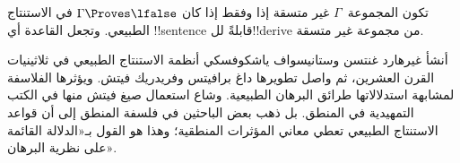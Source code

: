 \documentclass[../../../include/open-logic-section]{subfiles}
\begin{document}
تكون المجموعة~$\Gamma$ غير متسقة إذا وفقط إذا كان
$\Gamma \Proves \lfalse$ في الاستنتاج الطبيعي. وتجعل القاعدة
\FalseInt{} أي !!{sentence} قابلةً لل!!{derive} من مجموعة غير
متسقة.

أنشأ غيرهارد غنتسن وستانيسواف ياشكوفسكي أنظمة الاستنتاج الطبيعي في ثلاثينيات القرن العشرين، ثم واصل تطويرها داغ برافيتس وفريدريك فيتش.
ويؤثرها الفلاسفة لمشابهة استدلالاتها طرائق البرهان الطبيعية. وشاع استعمال صيغ فيتش منها في الكتب التمهيدية في المنطق.
بل ذهب بعض الباحثين في فلسفة المنطق إلى أن قواعد الاستنتاج الطبيعي تعطي معاني المؤثرات المنطقية؛ وهذا هو القول بـ«الدلالة القائمة على نظرية البرهان».
\end{document}
